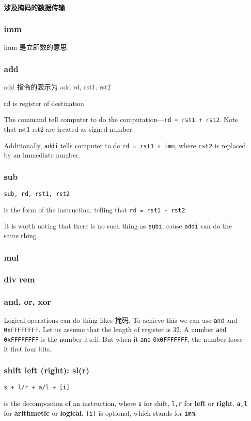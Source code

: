 \documentclass[12pt]{ctexart}
\theoremstyle{definition}
\theoremstyle{definition}
\theoremstyle{plain}
\begin{document}
\paragraph{涉及掩码的数据传输}


\subsubsection{imm}
imm 是立即数的意思. 
\subsubsection{add}
add 指令的表示为 
add rd, rst1, rst2

rd is register of destination

The command tell computer to do the computation---\texttt{rd = rst1 + rst2}. Note that rst1 rst2 are treated as signed number. 

Additionally, \texttt{addi} tells computer to do \texttt{rd = rst1 + imm}, where \texttt{rst2} is replaced by an immediate number.
\subsubsection{sub}
\centerline{\texttt{sub, rd, rst1, rst2}}
is the form of the instruction, telling that \texttt{rd = rst1 - rst2}. 

It is worth noting that there is no such thing as \texttt{subi}, cause \texttt{addi} can do the same thing.
\subsubsection{mul}
\subsubsection{div rem}
\subsubsection{and, or, xor}
Logical operations can do thing likes 掩码. To achieve this we can use \texttt{and} and \texttt{0xFFFFFFFF}. Let us assume that the length of register is 32. A number \texttt{and} \texttt{0xFFFFFFFF} is the number itself. But when it \texttt{and} \texttt{0x0FFFFFFF}, the number loose it first four bits.
\subsubsection{shift left (right): sl(r)}
\centerline{\texttt{s + l/r + a/l + [i]}}
is the decompostion of an instruction,
where \texttt{s} for shift, \texttt{l,r} for \textbf{left} or \textbf{right}, \texttt{a,l} for \textbf{arithmetic} or \textbf{logical}. \texttt{[i]} is optional, which stands for \texttt{imm}.
\end{document}
